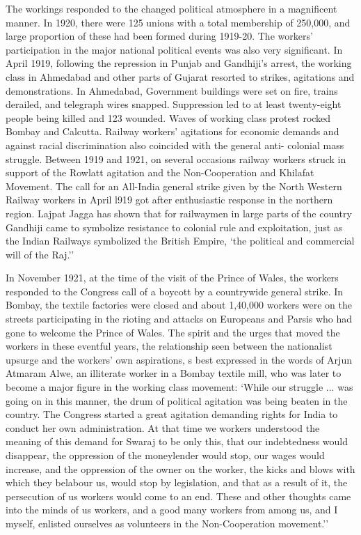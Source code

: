 The workings responded to the changed political atmosphere in a magnificent manner. In 1920, there were 125 unions with a total membership of 250,000, and large proportion of these had been formed during 1919-20. The workers' participation in the major national political events was also very significant. In April 1919, following the repression in Punjab and Gandhiji's arrest, the working class in Ahmedabad and other parts of Gujarat resorted to strikes, agitations and demonstrations. In Ahmedabad, Government buildings were set on fire, trains derailed, and telegraph wires snapped. Suppression led to at least twenty-eight people being killed and 123 wounded. Waves of working class protest rocked Bombay and Calcutta. Railway workers' agitations for economic demands and against racial discrimination also coincided with the general anti- colonial mass struggle. Between 1919 and 1921, on several occasions railway workers struck in support of the Rowlatt agitation and the Non-Cooperation and Khilafat Movement. The call for an All-India general strike given by the North Western Railway workers in April l919 got after enthusiastic response in the northern region. Lajpat Jagga has shown that for railwaymen in large parts of the country Gandhiji came to symbolize resistance to colonial rule and exploitation, just as the Indian Railways symbolized the British Empire, `the political and commercial will of the Raj.''

In November 1921, at the time of the visit of the Prince of Wales, the workers responded to the Congress call of a boycott by a countrywide general strike. In Bombay, the textile factories were closed and about 1,40,000 workers were on the streets participating in the rioting and attacks on Europeans and Parsis who had gone to welcome the Prince of Wales. The spirit and the urges that moved the workers in these eventful years, the relationship seen between the nationalist upsurge and the workers' own aspirations, s best expressed in the words of Arjun Atmaram Alwe, an illiterate worker in a Bombay textile mill, who was later to become a major figure in the working class movement: `While our struggle ... was going on in this manner, the drum of political agitation was being beaten in the country. The Congress started a great agitation demanding rights for India to conduct her own administration. At that time we workers understood the meaning of this demand for Swaraj to be only this, that our indebtedness would disappear, the oppression of the moneylender would stop, our wages would increase, and the oppression of the owner on the worker, the kicks and blows with which they belabour us, would stop by legislation, and that as a result of it, the persecution of us workers would come to an end. These and other thoughts came into the minds of us workers, and a good many workers from among us, and I myself, enlisted ourselves as volunteers in the Non-Cooperation movement.''

